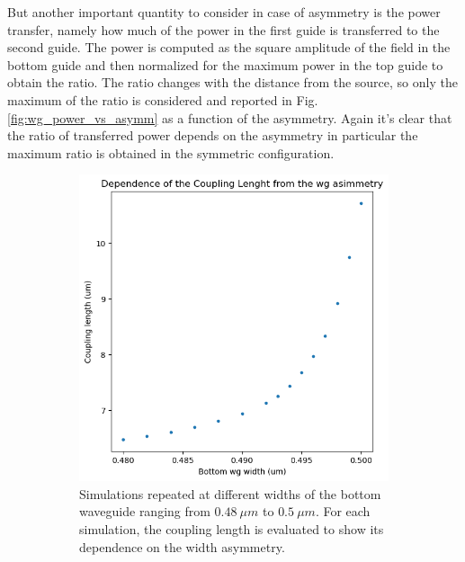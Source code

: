 But another important quantity to consider in case of asymmetry is the power transfer, namely how much of the power in the first guide is transferred to the second guide. The power is computed as the square amplitude of the field in the bottom guide and then normalized for the maximum power in the top guide to obtain the ratio. The ratio changes with the distance from the source, so only the maximum of the ratio is considered and reported in Fig. \ref{fig:wg_power_vs_asymm} as a function of the asymmetry. Again it's clear that the ratio of transferred power depends on the asymmetry in particular the maximum ratio is obtained in the symmetric configuration.

\begin{figure}[H]
    \centering
    \vfill
    \begin{subfigure}[b]{0.48\linewidth}
        \centering
        \includegraphics[width=\linewidth]{Figures/wg_coupling_vs_asymm.png}
        \caption{Simulations repeated at different widths of the bottom waveguide ranging from \(0.48\ \mu m\) to \(0.5\ \mu m\). For each simulation, the coupling length is evaluated to show its dependence on the width asymmetry.}
        \label{fig:wg_coupling_vs_asymm}
    \end{subfigure}
    \hfill
    \begin{subfigure}[b]{0.48\linewidth}
        \centering

\end{subfigure}
\end{figure}
